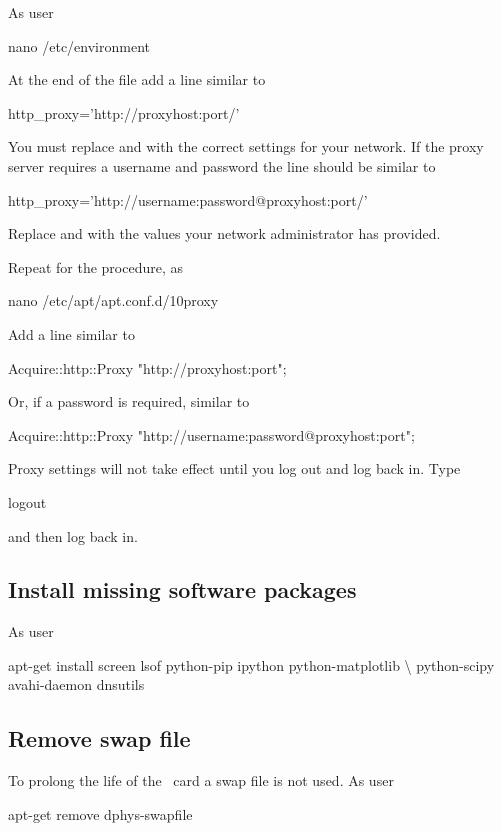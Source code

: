 As user \rootUser
\begin{Cmd}
nano /etc/environment  
\end{Cmd}

At the end of the file add a line similar to
\begin{Cmd}
http_proxy='http://proxyhost:port/'
\end{Cmd}
You must replace  and  with the correct
settings for your network. If the proxy server requires a username and
password the line should be similar to
\begin{Cmd}
http_proxy='http://username:password@proxyhost:port/'
\end{Cmd}
Replace  and  with the values your
network administrator has provided.

Repeat for the procedure, as \rootUser
\begin{Cmd}
nano /etc/apt/apt.conf.d/10proxy
\end{Cmd}

Add a line similar to
\begin{Cmd}
Acquire::http::Proxy "http://proxyhost:port";
\end{Cmd}
Or, if a password is required, similar to
\begin{Cmd}
Acquire::http::Proxy "http://username:password@proxyhost:port";
\end{Cmd}

Proxy settings will not take effect until you log out and log back
in. Type
\begin{Cmd}
logout
\end{Cmd}
and then log back in.

\subsection{Install missing software packages}
As user \rootUser
\begin{Cmd}
apt-get install screen lsof python-pip ipython python-matplotlib \textbackslash
    python-scipy avahi-daemon dnsutils
\end{Cmd}

\subsection{Remove swap file}
To prolong the life of the \sd\ card a swap file is not used. As user
\rootUser
\begin{Cmd}
apt-get remove dphys-swapfile  
\end{Cmd}

